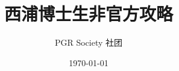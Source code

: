 \documentclass[lang=cn,12pt,newtx]{elegantbook}
\title{西浦博士生非官方攻略}
\author{PGR Society 社团}
\date{\today}
\begin{document}
\maketitle
\frontmatter


\tableofcontents
\mainmatter








\backmatter	

\makeatletter
\makeatother
\end{document}
